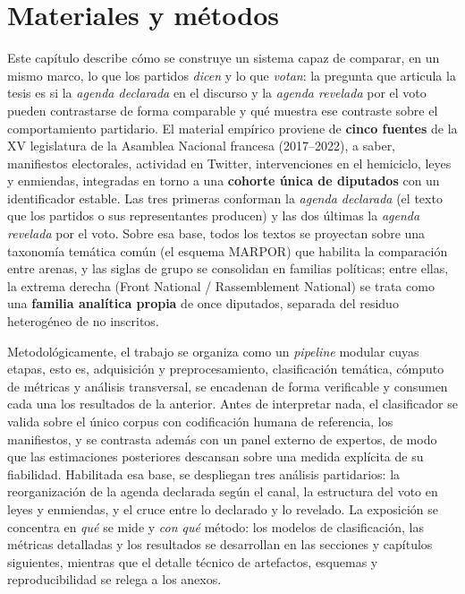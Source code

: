 \chapter{Materiales y métodos}
\label{cap:metodologia}


Este capítulo describe cómo se construye un sistema capaz de comparar, en un
mismo marco, lo que los partidos \emph{dicen} y lo que \emph{votan}: la pregunta
que articula la tesis es si la \emph{agenda declarada} en el discurso y la
\emph{agenda revelada} por el voto pueden contrastarse de forma comparable y qué
muestra ese contraste sobre el comportamiento partidario. El material empírico
proviene de \textbf{cinco fuentes} de la XV legislatura de la Asamblea Nacional
francesa (2017--2022), a saber, manifiestos electorales, actividad en Twitter,
intervenciones en el hemiciclo, leyes y enmiendas, integradas en torno a una
\textbf{cohorte única de diputados} con un identificador estable. Las tres
primeras conforman la \emph{agenda declarada} (el texto que los partidos o sus
representantes producen) y las dos últimas la \emph{agenda revelada} por el voto.
Sobre esa base, todos los textos se proyectan sobre una taxonomía temática común
(el esquema MARPOR) que habilita la comparación entre arenas, y las siglas de
grupo se consolidan en familias políticas; entre ellas, la extrema derecha (Front
National / Rassemblement National) se trata como una \textbf{familia analítica
propia} de once diputados, separada del residuo heterogéneo de no inscritos.

Metodológicamente, el trabajo se organiza como un \emph{pipeline} modular cuyas
etapas, esto es, adquisición y preprocesamiento, clasificación temática, cómputo
de métricas y análisis transversal, se encadenan de forma verificable y
consumen cada una los resultados de la anterior. Antes de interpretar nada, el
clasificador se valida sobre el único corpus con codificación humana de
referencia, los manifiestos, y se contrasta además con un panel externo de
expertos, de modo que las estimaciones posteriores descansan sobre una medida
explícita de su fiabilidad. Habilitada esa base, se despliegan tres análisis
partidarios: la reorganización de la agenda declarada según el canal, la
estructura del voto en leyes y enmiendas, y el cruce entre lo declarado y lo
revelado. La exposición se concentra en \emph{qué} se mide y \emph{con qué}
método: los modelos de clasificación, las métricas detalladas y los resultados
se desarrollan en las secciones y capítulos siguientes, mientras que el detalle
técnico de artefactos, esquemas y reproducibilidad se relega a los anexos.

